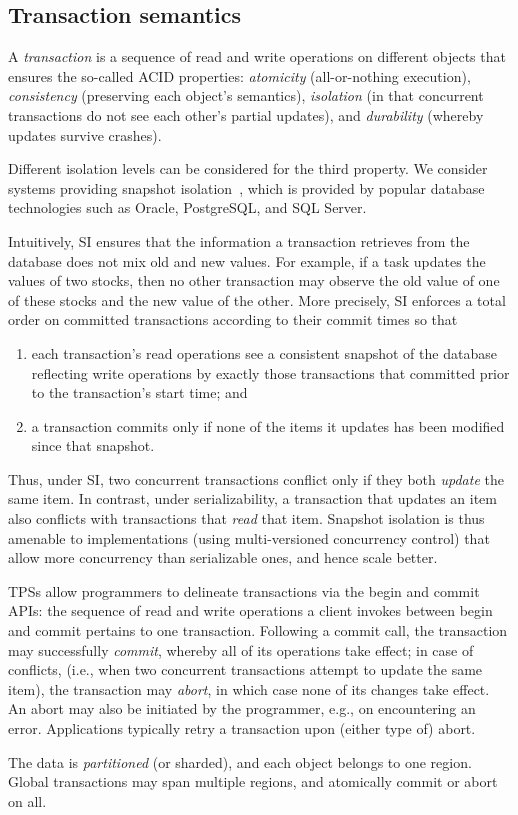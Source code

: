 \subsection{Transaction semantics} \label{ssec:transactions}

A \emph{transaction} is a sequence of read and write operations on different objects that ensures the so-called ACID properties:
\emph{atomicity} (all-or-nothing execution), \emph{consistency} (preserving each object's semantics), 
\emph{isolation} (in that concurrent transactions do not see each other's partial updates), and 
\emph{durability} (whereby updates survive crashes).

Different isolation levels can be considered for the third property. We consider systems providing  
snapshot isolation~\cite{DBLP:conf/sigmod/BerensonBGMOO95}, 
which is provided by popular database technologies such as Oracle, PostgreSQL, and SQL Server.

Intuitively, SI ensures that the information a transaction retrieves from the database 
does not mix old and new values. For example, if a task updates the values of two stocks, then no other transaction may observe the old value of one of these stocks and the new value of the other. 
%
More precisely, SI enforces a total order on committed transactions according to their commit times so that 
\begin{enumerate}
    \setlength{\itemsep}{0pt}
    \setlength{\parskip}{0pt}
    \setlength{\parsep}{2pt}  
\item
each transaction's read operations see a consistent snapshot of the database reflecting write operations by
 exactly those transactions that committed prior to the transaction's start time; and 
\item
 a transaction commits only if none of the items it updates has been modified since that snapshot.
 \end{enumerate}
Thus, under SI, two concurrent transactions conflict only if they both \emph{update} the same item.  
In contrast, under serializability, a transaction that updates an item also conflicts with transactions that \emph{read} that item. Snapshot isolation is thus amenable to implementations (using multi-versioned concurrency control) that 
allow more concurrency than serializable ones, and hence scale better.

TPSs allow programmers to  delineate transactions via the begin and commit APIs: 
the sequence of read and write operations a client invokes between begin and  commit pertains to one transaction.
Following a commit call, the transaction may successfully \emph{commit}, whereby all of its operations take effect;
in case of conflicts, (i.e., when two concurrent transactions attempt to update the same item), the transaction may
\emph{abort}, in which case none of its changes take effect. An abort may also be initiated by the programmer, e.g., 
on encountering an error. Applications typically retry a transaction upon (either type of) abort. 


The data is \emph{partitioned} (or sharded), and each object belongs to one region. 
Global transactions may span multiple regions, and atomically commit or abort on all. 

